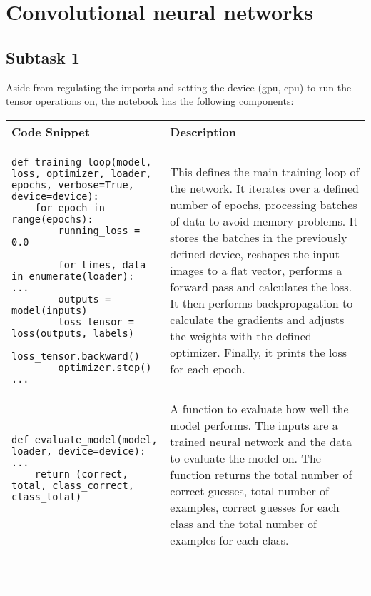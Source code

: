 \section{Convolutional neural networks}

\subsection*{Subtask 1}

Aside from regulating the imports and setting the device (gpu, cpu) to run the tensor operations on, the notebook has the following components:

\footnotesize
\begin{longtable}{|m{}|m{}|} \hline
\textbf{Code Snippet} & \textbf{Description} \\ \hline

\begin{lstlisting}
def training_loop(model, loss, optimizer, loader, epochs, verbose=True, device=device):
    for epoch in range(epochs):
        running_loss = 0.0

        for times, data in enumerate(loader):
...
        outputs = model(inputs)
        loss_tensor = loss(outputs, labels)
        loss_tensor.backward()
        optimizer.step()
...
\end{lstlisting} & This defines the main training loop of the network. It iterates over a defined number of epochs, processing batches of data to avoid memory problems. It stores the batches in the previously defined device, reshapes the input images to a flat vector, performs a forward pass and calculates the loss. It then performs backpropagation to calculate the gradients and adjusts the weights with the defined optimizer. Finally, it prints the loss for each epoch.\\ \hline

\begin{lstlisting}
def evaluate_model(model, loader, device=device):
...
    return (correct, total, class_correct, class_total)


\end{lstlisting} & A function to evaluate how well the model performs. The inputs are a trained neural network and the data to evaluate the model on. The function returns the total number of correct guesses, total number of examples, correct guesses for each class and the total number of examples for each class.   \\ \hline

\begin{lstlisting}


\end{lstlisting}
\end{longtable}
